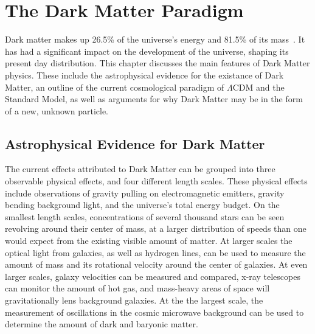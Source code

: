 \cleartooddpage[\thispagestyle{empty}]
\chapter{The Dark Matter Paradigm}

  Dark matter makes up 26.5\% of the universe's energy and 81.5\% of its mass~\cite{planck2015}.
  It has had a significant impact on the development of the universe, shaping its present day distribution.
  This chapter discusses the main features of Dark Matter physics.
  These include the astrophysical evidence for the existance of Dark Matter, an outline of the current cosmological paradigm of $\Lambda$CDM and the Standard Model, as well as arguments for why Dark Matter may be in the form of a new, unknown particle.


\section{Astrophysical Evidence for Dark Matter}
  
  The current effects attributed to Dark Matter can be grouped into three observable physical effects, and four different length scales.
  These physical effects include observations of gravity pulling on electromagnetic emitters, gravity bending background light, and the universe's total energy budget.
  On the smallest length scales, concentrations of several thousand stars can be seen revolving around their center of mass, at a larger distribution of speeds than one would expect from the existing visible amount of matter.
  At larger scales the optical light from galaxies, as well as hydrogen lines, can be used to measure the amount of mass and its rotational velocity around the center of galaxies.
  At even larger scales, galaxy velocities can be measured and compared, x-ray telescopes can monitor the amount of hot gas, and mass-heavy areas of space will gravitationally lens background galaxies.
  At the the largest scale, the measurement of oscillations in the cosmic microwave background can be used to determine the amount of dark and baryonic matter.
  
